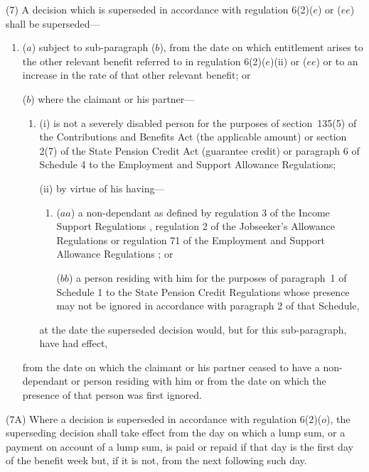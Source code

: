 \documentclass[12pt,a4paper]{article}
\begin{document}
(7) A decision which is superseded in accordance with regulation 6(2)($e$)  or ($ee$)  shall be superseded—
\begin{enumerate}\item[]
($a$) subject to sub-paragraph ($b$), from the date on which entitlement arises to the other relevant benefit referred to in regulation 6(2)($e$)(ii)  or ($ee$)  or to an increase in the rate of that other relevant benefit; or

($b$) where the claimant or his partner—
\begin{enumerate}\item[]
(i) is not a severely disabled person for the purposes of section~135(5) of the Contributions and Benefits Act (the applicable amount) or section 2(7) of the State Pension Credit Act (guarantee credit)
or paragraph 6 of Schedule 4 to the Employment and Support Allowance Regulations;  %

(ii) by virtue of his having—
\begin{enumerate}\item[]
($aa$) a non-dependant as defined by regulation 3 of the Income Support Regulations%
, regulation 2 of the Jobseeker’s Allowance Regulations  %
or regulation 71 of the Employment and Support Allowance Regulations%
; or

($bb$) a person residing with him for the purposes of paragraph~1 of Schedule 1 to the State Pension Credit Regulations whose presence may not be ignored in accordance with paragraph 2 of that Schedule,
\end{enumerate}
at the date the superseded decision would, but for this sub-paragraph, have had effect,
\end{enumerate}
from the date on which the claimant or his partner ceased to have a non-dependant or person residing with him or from the date on which the presence of that person was first ignored.
\end{enumerate}

(7A) Where a decision is superseded in accordance with regulation 6(2)($o$), the superseding decision shall take effect from the day on which a lump sum, or a payment on account of a lump sum, is paid or repaid if that day is the first day of the benefit week but, if it is not, from the next following such day.
\end{document}
